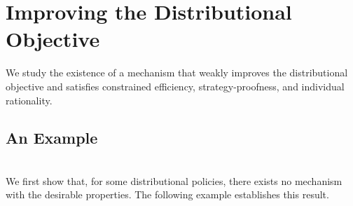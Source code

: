 \documentclass[12pt]{amsart}
\theoremstyle{remark}
\begin{document}
\section{Improving the Distributional Objective}\label{sec:TTC}
We study the existence of a mechanism that weakly improves the distributional objective and satisfies
constrained efficiency, strategy-proofness, and individual rationality.

\subsection{An Example}\hfill\\
We first show that, for some distributional policies, there exists no mechanism
with the desirable properties. The following example establishes this result.
\end{document}
